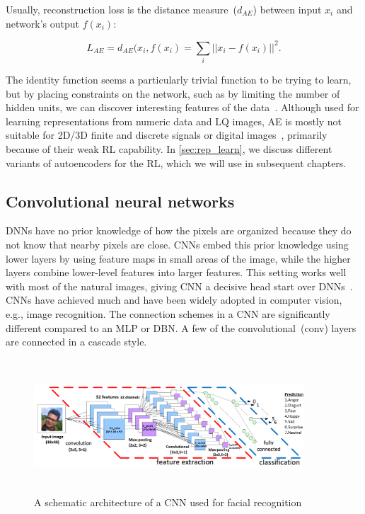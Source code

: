 Usually, reconstruction loss is the distance measure~($d_{AE}$) between input $x_i$ and network's output $f(x_i)$: 

\vspace{-2mm}
\begin{equation}
    L_{AE}=\text{$d_{AE}$}(x_i, f(x_i) = \sum_{i} ||x_{i}-f(x_i)||^{2}.
    \label{eq:Loss1}
\end{equation}

\hspace*{3.5mm} The identity function seems a particularly trivial function to be trying to learn, but by placing constraints on the network, such as by limiting the number of hidden units, we can discover interesting features of the data~\cite{karimDLTF2018}. Although used for learning representations from numeric data and LQ images, AE is mostly not suitable for 2D/3D finite and discrete signals or digital images~\cite{min2018survey}, primarily because of their weak RL capability. In \cref{sec:rep_learn}, we discuss different variants of autoencoders for the RL, which we will use in subsequent chapters. 

\subsection{Convolutional neural networks}
DNNs have no prior knowledge of how the pixels are organized because they do not know that nearby pixels are close. CNNs embed this prior knowledge using lower layers by using feature maps in small areas of the image, while the higher layers combine lower-level features into larger features. This setting works well with most of the natural images, giving CNN a decisive head start over DNNs~\cite{karimIoT2019}. CNNs have achieved much and have been widely adopted in computer vision, e.g., image recognition. The connection schemes in a CNN are significantly different compared to an MLP or DBN. A few of the convolutional~(conv) layers are connected in a cascade style. 

\begin{figure}[h]
    \centering
    \includegraphics[width=0.9\textwidth,height=50mm]{images/cnn.png}
    \caption{A schematic architecture of a CNN used for facial recognition~\cite{karim2017predictive,zaccone2018deep}}
    \label{fig:cnn_theory1}
\end{figure}

